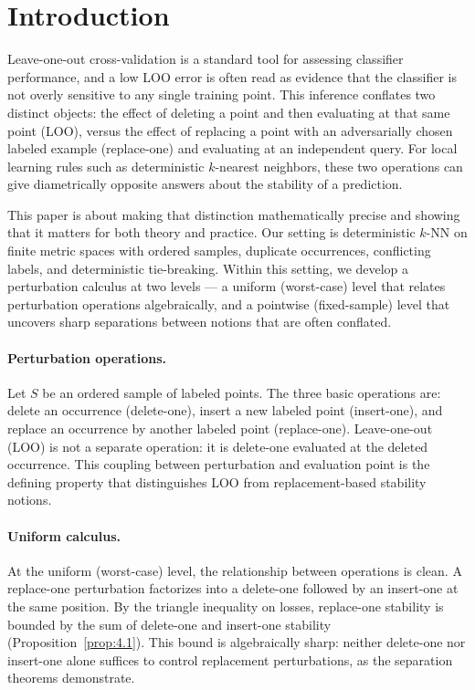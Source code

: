 \section{Introduction}
\label{sec:introduction}

Leave-one-out cross-validation is a standard tool for assessing
classifier performance, and a low LOO error is often read as evidence that the
classifier is not overly sensitive to any single training point. This
inference conflates two distinct objects: the effect of deleting a point and
then evaluating at that same point (LOO), versus the effect of replacing a
point with an adversarially chosen labeled example (replace-one) and
evaluating at an independent query. For local learning rules such as
deterministic $k$-nearest neighbors, these two operations can give
diametrically opposite answers about the stability of a prediction.

This paper is about making that distinction mathematically precise and
showing that it matters for both theory and practice. Our setting is
deterministic $k$-NN on finite metric spaces with ordered samples, duplicate
occurrences, conflicting labels, and deterministic tie-breaking. Within this
setting, we develop a perturbation calculus at two levels --- a uniform
(worst-case) level that relates perturbation operations algebraically, and a
pointwise (fixed-sample) level that uncovers sharp separations between
notions that are often conflated.

\paragraph{Perturbation operations.}
Let $S$ be an ordered sample of labeled points. The three basic operations
are: delete an occurrence (delete-one), insert a new labeled point
(insert-one), and replace an occurrence by another labeled point
(replace-one). Leave-one-out (LOO) is not a separate operation: it is
delete-one evaluated at the deleted occurrence. This coupling between
perturbation and evaluation point is the defining property that distinguishes
LOO from replacement-based stability notions.

\paragraph{Uniform calculus.}
At the uniform (worst-case) level, the relationship between operations is
clean. A replace-one perturbation factorizes into a delete-one followed by
an insert-one at the same position. By the triangle inequality on losses,
replace-one stability is bounded by the sum of delete-one and insert-one
stability (Proposition~\ref{prop:4.1}). This bound is algebraically sharp:
neither delete-one nor insert-one alone suffices to control replacement
perturbations, as the separation theorems demonstrate.


